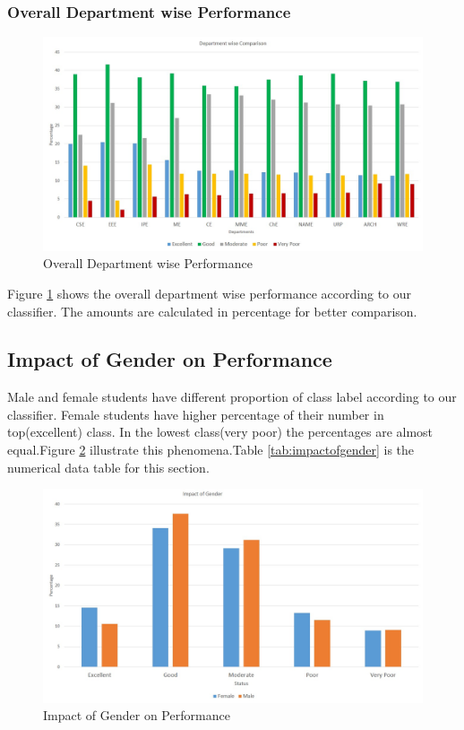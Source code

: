 \subsubsection{Overall Department wise Performance}
\begin{figure}
   \centering
  \includegraphics[width=\linewidth]{Figures/Slide19.jpg}
  \decoRule
  \caption[Overall Department wise Performance]{Overall Department wise Performance}
  \label{fig:Overall Department wise Performance}
\end{figure}

Figure \ref{fig:Overall Department wise Performance} shows the overall department wise performance according to our classifier. The amounts are calculated in percentage for better comparison.

\subsection{Impact of Gender on Performance}
Male and female students have different proportion of class label according to our classifier. Female students have higher percentage of their number in  top(excellent) class. In the lowest class(very poor) the percentages are almost equal.Figure \ref{fig:Impact of Gender on Performance} illustrate this phenomena.Table \ref{tab:impactofgender} is the numerical data table for this section.



\begin{figure}
   \centering
  \includegraphics[width=\linewidth]{Figures/Slide13.jpg}
  \decoRule
  \caption[Impact of Gender on Performance]{Impact of Gender on Performance}
  \label{fig:Impact of Gender on Performance}
\end{figure}


